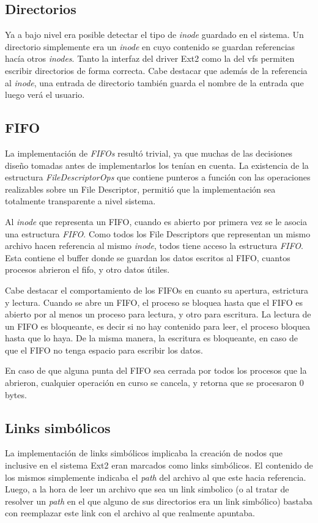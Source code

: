 \documentclass[a4paper,10pt]{article}
\begin{document}
\subsection{Directorios}

Ya a bajo nivel era posible detectar el tipo de \textit{inode} guardado en el sistema. Un directorio simplemente era
un \textit{inode} en cuyo contenido se guardan referencias hacía otros \textit{inodes}. Tanto la interfaz del driver Ext2 como la del
vfs permiten escribir directorios de forma correcta. Cabe destacar que además de la referencia al \textit{inode}, una entrada
de directorio también guarda el nombre de la entrada que luego verá el usuario.

\subsection{FIFO}
La implementación de \textit{FIFOs} resultó trivial, ya que muchas de las decisiones diseño tomadas antes de implementarlos los tenían en cuenta.
La existencia de la estructura \textit{FileDescriptorOps} que contiene punteros a función con las operaciones realizables sobre un File Descriptor,
 permitió que la implementación sea totalmente transparente a nivel sistema.

Al \textit{inode} que representa un FIFO, cuando es abierto por primera vez se le asocia una estructura \textit{FIFO}.
Como todos los File Descriptors que representan un mismo archivo hacen referencia al mismo \textit{inode}, todos tiene acceso la estructura \textit{FIFO}.
Esta contiene el buffer donde se guardan los datos escritos al FIFO, cuantos procesos abrieron el fifo, y otro datos útiles.

Cabe destacar el comportamiento de los FIFOs en cuanto su apertura, estrictura y lectura.
Cuando se abre un FIFO, el proceso se bloquea hasta que el FIFO es abierto por al menos un proceso para lectura, y otro para escritura.
La lectura de un FIFO es bloqueante, es decir si no hay contenido para leer, el proceso bloquea hasta que lo haya.
De la misma manera, la escritura es bloqueante, en caso de que el FIFO no tenga espacio para escribir los datos.

En caso de que alguna punta del FIFO sea cerrada por todos los procesos que la abrieron, cualquier operación en curso se cancela, y retorna que se procesaron 0 bytes.

\subsection{Links simbólicos}
La implementación de links simbólicos implicaba la creación de nodos que inclusive en el sistema Ext2 eran marcados
como links simbólicos. El contenido de los mismos simplemente indicaba el \textit{path} del archivo al que este
hacia referencia.
Luego, a la hora de leer un archivo que sea un link simbolico (o al tratar de resolver un \textit{path} en el que alguno
de sus directorios era un link simbólico) bastaba con reemplazar este link con el archivo al que realmente
apuntaba.
\end{document}
